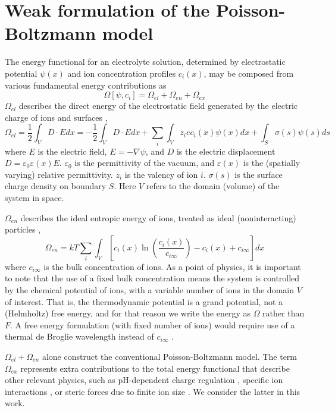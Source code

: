\section{Weak formulation of the Poisson-Boltzmann model}

The energy functional for an electrolyte solution, determined by
electrostatic potential $\psi(x)$ and ion concentration profiles
$c_i(x)$, may be composed from various fundamental energy
contributions as
\begin{equation}
    \Omega[\psi, c_i] = \Omega_{el} + \Omega_{en} +  \Omega_{ex}
\end{equation}
$\Omega_{el}$ describes the direct energy of the electrostatic field generated by the electric charge of ions and surfaces \citep{Jackson_Classical_Electrodynamics},
\begin{equation}
  \Omega_{el}  =\frac{1}{2} \int_{V}D \cdot E dx
  = -\frac{1}{2} \int_{V}D \cdot E dx + \sum_i \int_V z_i e c_i(x) \psi(x) dx
  + \int_{S} \sigma(s) \psi(s) ds
\end{equation}
where $E$ is the electric field, $E=-\nabla\psi$, and $D$ is the
electric displacement $D=\varepsilon_0
\varepsilon(x)E$. $\varepsilon_0$ is the permittivity of the vacuum,
and $\varepsilon(x)$ is the (spatially varying) relative
permittivity. $z_i$ is the valency of ion $i$.  $\sigma(s)$ is the
surface charge density on boundary $S$. Here $V$ refers to the domain
(volume) of the system in space.

$\Omega_{en}$ describes the ideal entropic energy of ions, treated as ideal (noninteracting) particles \citep{GrayStiles2018,DagmawiParsons2024},
\begin{equation}
    \Omega_{en} = kT \sum_{i} \int_{V} \left[ c_i(x) \ln \left(\frac{c_i(x)}{c_{i\infty}} \right) - c_{i}(x) + c_{i\infty} \right] dx 
\end{equation}
where $c_{i\infty}$ is the bulk concentration of ions. As a point of
physics, it is important to note that the use of a fixed bulk
concentration means the system is controlled by the chemical potential
of ions, with a variable number of ions in the domain $V$ of interest.
That is, the thermodynamic potential is a grand potential, not a
(Helmholtz) free energy, and for that reason we write the energy as $\Omega$ rather
than $F$. A free energy formulation (with fixed number of ions) would
require use of a thermal de Broglie wavelength instead of
$c_{i\infty}$ \citep{GrayStiles2018}.


$\Omega_{el} + \Omega_{en}$ alone construct the conventional
Poisson-Boltzmann model. The term $\Omega_{ex}$ represents extra
contributions to the total energy functional that describe other
relevant physics, such as pH-dependent charge regulation
\citep{ParsonsSalis2019}, specific ion interactions
\citep{ParsonsCarucciSalis2022}, or steric forces due to finite ion
size \citep{LopezGarciaHornoGrosse2018}. We consider the latter in this
work.

